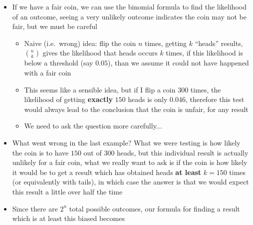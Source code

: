 \documentclass[english]{article}
\begin{document}
\begin{itemize}
\begin{itemize}
\item If we have $n$ items which are all unique, there are $n!$ ways to order them, we can put the first one anywhere in the order, we can put the second one in the $n-1$ remaining slots, etc...
\item However in the case of the coin, there are only two results and one heads is the same as another, so we need to account for this somehow, fortunately we can calculate how much $n!$ over-counts
\item If we assume the $k$ heads results are somehow distinct, than we would be overcounting by a factor of $k!$ because of the different orderings within these results, likewise ordering within the tails results would give an over-count of $(n-k)!$
\item Dividing by both of these gives us the number of solutions which come just form ordering between heads and tails results
\end{itemize}
\item If we have a fair coin, we can use the binomial formula to find the likelihood of an outcome, seeing a very unlikely outcome indicates the coin may not be fair, but we must be careful
\begin{itemize}
\item Naive (i.e.~wrong) idea: flip the coin $n$ times, getting $k$ ``heads'' results, $\binom{n}{k}$ gives the likelihood that heads occurs $k$ times, if this likelihood is below a threshold (say $0.05$), than we assume it could not have happened with a fair coin
\item This seems like a sensible idea, but if I flip a coin $300$ times, the likelihood of getting \textbf{exactly} $150$ heads is only $0.046$, therefore this test would always lead to the conclusion that the coin is unfair, for any result
\item We need to ask the question more carefully...
\end{itemize}
\item What went wrong in the last example? What we were testing is how likely the coin is to have $150$ out of $300$ heads, but this individual result is actually unlikely for a fair coin, what we really want to ask is if the coin is how likely it would be to get a result which has obtained heads \textbf{at least} $k=150$ times (or equivalently with tails), in which case the answer is that we would expect this result a little over half the time
\item Since there are $2^n$ total possible outcomes, our formula for finding a result which is at least this biased becomes

\end{itemize}
\end{document}
